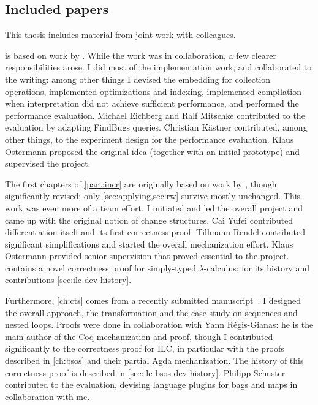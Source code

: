 \subsection{Included papers}
This thesis includes material from joint work with colleagues.

 is based on work by \citet*{GiarrussoAOSD13}. While the
work was in collaboration, a few clearer responsibilities arose.
I did most of the implementation work, and collaborated to the writing: among
other things I devised the embedding for collection operations, implemented
optimizations and indexing, implemented compilation when interpretation did not
achieve sufficient performance, and performed the performance evaluation.
Michael Eichberg and Ralf Mitschke contributed to the evaluation by adapting
FindBugs queries.
Christian K{\"{a}}stner contributed, among other things, to the experiment
design for the performance evaluation. Klaus Ostermann proposed the original
idea (together with an initial prototype) and supervised the project.

The first chapters of \cref{part:incr} are originally based on work by \citet*{CaiEtAl2014ILC}, though
significantly revised; only \cref{sec:applying,sec:rw} survive mostly unchanged.
This work was even more of a team effort. I initiated and led the
overall project and came up with the original notion of change structures. Cai
Yufei contributed differentiation itself and its first correctness proof.
Tillmann Rendel contributed significant simplifications and started the overall
mechanization effort. Klaus Ostermann provided senior supervision that proved
essential to the project.
 contains a novel correctness proof for simply-typed $\lambda$-calculus;
for its history and contributions \cref{sec:ilc-dev-history}.

Furthermore, \cref{ch:cts} comes from a recently submitted
manuscript~\citep*{Giarrusso2018Static}. I
designed the overall approach, the transformation and the case study on
sequences and nested loops. Proofs were done in collaboration with Yann
Régis-Gianas: he is the main author of the Coq mechanization and proof, though I
contributed significantly to the correctness proof for ILC\@, in particular with
the proofs described in \cref{ch:bsos} and their partial Agda mechanization.
The history of this correctness proof is described in
\cref{sec:ilc-bsos-dev-history}.
Philipp Schuster contributed to the evaluation,
devising language plugins for bags and maps in collaboration with me.

